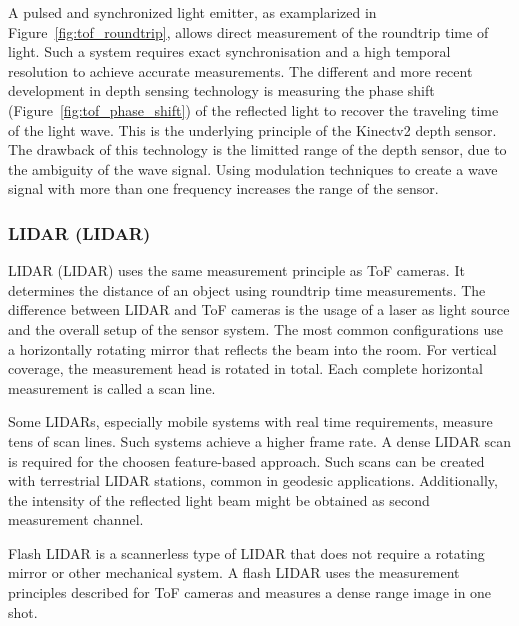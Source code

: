 A pulsed and synchronized light emitter, as examplarized in Figure~\ref{fig:tof_roundtrip}, allows direct measurement of the roundtrip time of light.
Such a system requires exact synchronisation and a high temporal resolution to achieve accurate measurements.
The different and more recent development in depth sensing technology is measuring the phase shift (Figure~\ref{fig:tof_phase_shift}) of the reflected light to recover the traveling time of the light wave.
This is the underlying principle of the Kinectv2 depth sensor\cite{wasenmuller_accv2016}.
The drawback of this technology is the limitted range of the depth sensor, due to the ambiguity of the wave signal.
Using modulation techniques to create a wave signal with more than one frequency increases the range of the sensor\cite[p. 27-41]{hansard_springer2012}.

\subsubsection{\acrlong{LIDAR} (\acrshort{LIDAR})}

\acrlong{LIDAR} (\acrshort{LIDAR}) uses the same measurement principle as \acrshort{ToF} cameras\cite[p. 239]{taylor_crc2019}.
It determines the distance of an object using roundtrip time measurements.
The difference between \acrshort{LIDAR} and \acrshort{ToF} cameras is the usage of a \acrshort{laser} as light source and the overall setup of the sensor system.
The most common configurations use a horizontally rotating mirror that reflects the beam into the room.
For vertical coverage, the measurement head is rotated in total.
Each complete horizontal measurement is called a scan line.

Some \acrshort{LIDAR}s, especially mobile systems with real time requirements, measure tens of scan lines.
Such systems achieve a higher frame rate.
A dense \acrshort{LIDAR} scan is required for the choosen feature-based approach.
Such scans can be created with terrestrial \acrshort{LIDAR} stations, common in geodesic applications.
Additionally, the intensity of the reflected light beam might be obtained as second measurement channel.

Flash \acrshort{LIDAR} is a scannerless type of \acrshort{LIDAR} that does not require a rotating mirror or other mechanical system\cite{natale_ssiai2010}.
A flash \acrshort{LIDAR} uses the measurement principles described for \acrshort{ToF} cameras and measures a dense range image in one shot.

